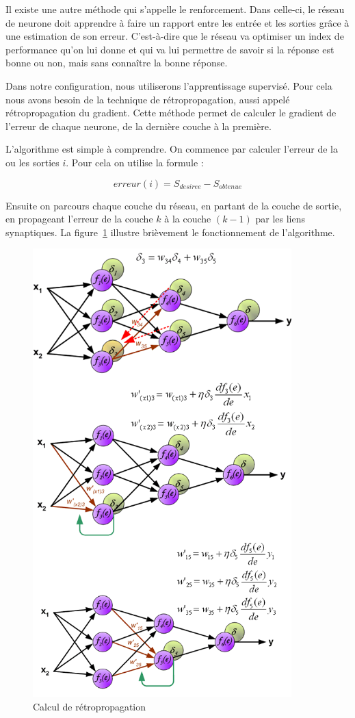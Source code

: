 \documentclass[11pt]{report}
\begin{document}
Il existe une autre méthode qui s'appelle le renforcement. Dans celle-ci, le réseau de neurone doit apprendre à faire un rapport entre les entrée et les sorties grâce à une estimation de son erreur. C'est-à-dire que le réseau va optimiser un index de performance qu'on lui donne et qui va lui permettre de savoir si la réponse est bonne ou non, mais sans connaître la  bonne réponse.

Dans notre configuration, nous utiliserons l'apprentissage supervisé. Pour cela nous avons besoin de la technique de rétropropagation, aussi appelé rétropropagation du gradient. Cette méthode permet de calculer le gradient de l'erreur de chaque neurone, de la dernière couche à la première.

L'algorithme est simple à comprendre. On commence par calculer l'erreur de la ou les sorties $i$. Pour cela on utilise la formule :

\[ erreur(i) = S_{desiree} - S_{obtenue} \]

Ensuite on parcours chaque couche du réseau, en partant de la couche de sortie, en propageant l'erreur de la couche $k$ à la couche $(k-1)$ par les liens synaptiques. La figure~\ref{retropropagation} illustre brièvement le fonctionnement de l'algorithme.

\begin{figure}[htbp]
\centering
\includegraphics[width=10cm]{retropropagation.png}
\caption{Calcul de rétropropagation}
\label{retropropagation}
\end{figure}
\end{document}
